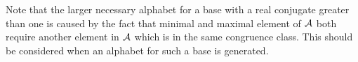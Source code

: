 Note that the larger necessary alphabet for a base with a real conjugate greater than one is caused by the fact that minimal and maximal element of $\mathcal{A}$ both require another element in $\mathcal{A}$ which is in the same congruence class. This should be considered when an alphabet for such a base is generated.

